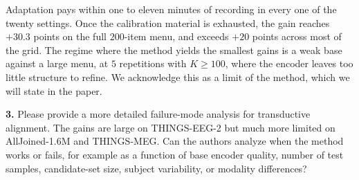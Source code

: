 \documentclass[11pt]{article}
\begin{document}
{Adaptation pays within one to eleven minutes of recording in every one of the twenty settings. Once the calibration material is exhausted, the gain reaches $+30.3$ points on the full $200$-item menu, and exceeds $+20$ points across most of the grid. The regime where the method yields the smallest gains is a weak base against a large menu, at $5$ repetitions with $K \geq 100$, where the encoder leaves too little structure to refine. We acknowledge this as a limit of the method, which we will state in the paper.
}

\textbf{3.} Please provide a more detailed failure-mode analysis for transductive alignment. The gains
are large on THINGS-EEG-2 but much more limited on AllJoined-1.6M and THINGS-MEG. Can the authors
analyze when the method works or fails, for example as a function of base encoder quality, number of
test samples, candidate-set size, subject variability, or modality differences?
\end{document}
